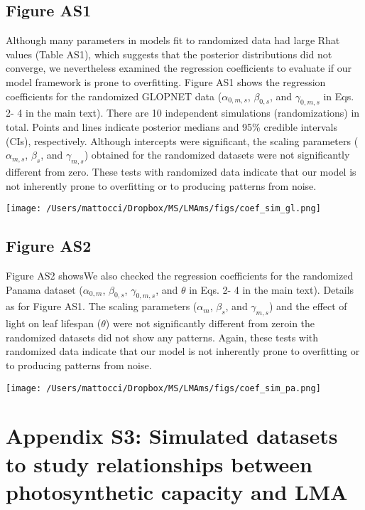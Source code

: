 \documentclass[
  12pt,
  letterpaper,
  DIV=11,
  numbers=noendperiod]{scrartcl}
\begin{document}
\newpage

\hypertarget{figure-as1}{%
\subsection{Figure AS1}\label{figure-as1}}

Although many parameters in models fit to randomized data had large Rhat
values (Table AS1), which suggests that the posterior distributions did
not converge, we nevertheless examined the regression coefficients to
evaluate if our model framework is prone to overfitting. Figure AS1
shows the regression coefficients for the randomized GLOPNET data
(\(\alpha_{0, m, s}\), \(\beta_{0, s}\), and \(\gamma_{0, m, s}\) in
Eqs. 2- 4 in the main text). There are 10 independent simulations
(randomizations) in total. Points and lines indicate posterior medians
and 95\% credible intervals (CIs), respectively. Although intercepts
were significant, the scaling parameters (\(\alpha_{m, s}\),
\(\beta_{s}\), and \(\gamma_{m, s}\)) obtained for the randomized
datasets were not significantly different from zero. These tests with
randomized data indicate that our model is not inherently prone to
overfitting or to producing patterns from noise.

\texttt{[image: /Users/mattocci/Dropbox/MS/LMAms/figs/coef\_sim\_gl.png]}

\newpage

\hypertarget{figure-as2}{%
\subsection{Figure AS2}\label{figure-as2}}

Figure AS2 showsWe also checked the regression coefficients for the
randomized Panama dataset (\(\alpha_{0, m}\), \(\beta_{0, s}\),
\(\gamma_{0, m, s}\), and \(\theta\) in Eqs. 2- 4 in the main text).
Details as for Figure AS1. The scaling parameters (\(\alpha_{m}\),
\(\beta_{s}\), and \(\gamma_{m, s}\)) and the effect of light on leaf
lifespan (\(\theta\)) were not significantly different from zeroin the
randomized datasets did not show any patterns. Again, these tests with
randomized data indicate that our model is not inherently prone to
overfitting or to producing patterns from noise.

\texttt{[image: /Users/mattocci/Dropbox/MS/LMAms/figs/coef\_sim\_pa.png]}

\newpage

\hypertarget{appendix-s3-simulated-datasets-to-study-relationships-between-photosynthetic-capacity-and-lma}{%
\section{Appendix S3: Simulated datasets to study relationships between
photosynthetic capacity and
LMA}\label{appendix-s3-simulated-datasets-to-study-relationships-between-photosynthetic-capacity-and-lma}}
\end{document}
